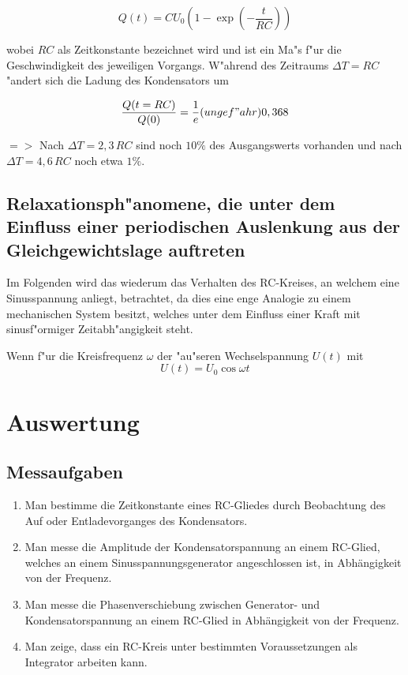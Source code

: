 \documentclass{scrartcl}
\begin{document}
				\begin{equation}
					Q(t) = C U_\mathrm{0} \left( 1 - \exp{ \left( -\frac{t}{RC} \right) } \right)
				\end{equation}

				wobei $RC$ als Zeitkonstante bezeichnet wird und ist ein Ma"s f"ur die Geschwindigkeit des jeweiligen Vorgangs. W"ahrend des Zeitraums 
				$\Delta T = RC$ "andert sich die Ladung des Kondensators um

				\begin{equation}
					\frac{Q(t = RC)}{Q(0)} = \frac{1}{e} (ungef"ahr) 0,368
				\end{equation}

				$=>$ Nach $\Delta T = 2,3 \, RC$ sind noch $10 \%$ des Ausgangswerts vorhanden und nach $\Delta T = 4,6 \, RC$ noch etwa $1 \%$.

		\subsection{Relaxationsph"anomene, die unter dem Einfluss einer periodischen Auslenkung aus der Gleichgewichtslage auftreten}

			Im Folgenden wird das wiederum das Verhalten des RC-Kreises, an welchem eine Sinusspannung anliegt, betrachtet, da dies eine enge Analogie zu einem mechanischen System besitzt, welches unter dem Einfluss einer Kraft mit sinusf"ormiger Zeitabh"angigkeit steht.


			Wenn f"ur die Kreisfrequenz $\omega$ der "au"seren Wechselspannung $U(t)$ mit
			\begin{equation}
				U(t) = U_\mathrm{0} \cos{\omega t}
			\end{equation}

	\section{Auswertung}

		\subsection{Messaufgaben}

			\begin{enumerate}
				\item Man bestimme die Zeitkonstante eines RC-Gliedes durch Beobachtung des Auf oder Entladevorganges des Kondensators.
				\item Man messe die Amplitude der Kondensatorspannung an einem RC-Glied, welches an einem Sinusspannungsgenerator angeschlossen ist, in Abhängigkeit von der Frequenz.
				\item Man messe die Phasenverschiebung zwischen Generator- und Kondensatorspannung an einem RC-Glied in Abhängigkeit von der Frequenz.
				\item Man zeige, dass ein RC-Kreis unter bestimmten Voraussetzungen als Integrator arbeiten kann.
			\end{enumerate}
\end{document}
